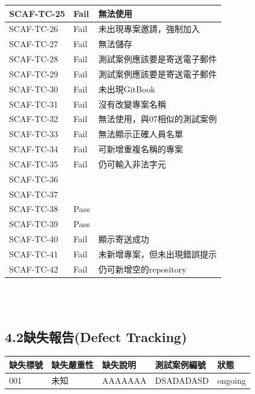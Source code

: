 \documentclass{report}
\begin{document}
\begin{tabularx}{\textwidth}{
  |p{}%
  |p{}%
  |p{}|%
}
  SCAF-TC-25 & Fail & 無法使用\\ \hline
  SCAF-TC-26 & Fail & 未出現專案邀請，強制加入 \\ \hline
  SCAF-TC-27 & Fail & 無法儲存 \\ \hline
  SCAF-TC-28 & Fail & 測試案例應該要是寄送電子郵件 \\ \hline
  SCAF-TC-29 & Fail & 測試案例應該要是寄送電子郵件 \\ \hline
  SCAF-TC-30 & Fail & 未出現GitBook \\ \hline
  SCAF-TC-31 & Fail & 沒有改變專案名稱 \\ \hline
  SCAF-TC-32 & Fail & 無法使用，與07相似的測試案例 \\ \hline
  SCAF-TC-33 & Fail & 無法顯示正確人員名單 \\ \hline
  SCAF-TC-34 & Fail & 可新增重複名稱的專案 \\ \hline
  SCAF-TC-35 & Fail & 仍可輸入非法字元 \\ \hline
  SCAF-TC-36 &  &  \\ \hline
  SCAF-TC-37 &  &  \\ \hline
  SCAF-TC-38 & Pass &  \\ \hline
  SCAF-TC-39 & Pass &  \\ \hline
  SCAF-TC-40 & Fail & 顯示寄送成功 \\ \hline
  SCAF-TC-41 & Fail & 未新增專案，但未出現錯誤提示 \\ \hline
  SCAF-TC-42 & Fail & 仍可新增空的repository \\ \hline

\end{tabularx}
\\
\newline
\\
\subsection*{4.2缺失報告(Defect Tracking)}
\begin{tabularx}{\textwidth}{ 
  |p{}%
  |p{}%
  |p{}%
  |p{}%
  |p{}|%
}
  \hline
  缺失標號 & 缺失嚴重性 & 缺失說明 & 測試案例編號 & 狀態\\
  \hline
  001 & 未知 & AAAAAAA & DSADADASD & ongoing  \\
  \hline
\end{tabularx}
\\
\newline
\\
\end{document}
